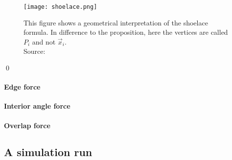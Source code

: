 \begin{proposition}
\begin{center}
	\end{center} 
	\begin{figure}[h!]
		\begin{center}
			\texttt{[image: shoelace.png]}
			\caption{
				This figure shows a geometrical interpretation of the shoelace formula. In difference to the proposition, here the vertices are called $P_i$ and not $\vec{x}_i$. \\
				Source: \cite{ShoelaceFigure2022}}
			\label{fig:shoelace}
		\end{center}
	\end{figure}
	\qed
\end{proposition}

\paragraph{Edge force}

\paragraph{Interior angle force}

\paragraph{Overlap force}

\subsection{A simulation run}
